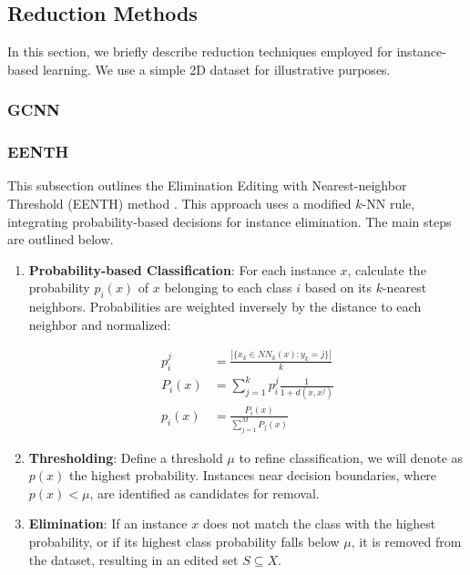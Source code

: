 
\subsection{Reduction Methods}
In this section, we briefly describe reduction techniques employed for instance-based learning. We use a simple 2D dataset for illustrative purposes.

\subsubsection{GCNN}


\subsubsection{EENTH}
This subsection outlines the Elimination Editing with Nearest-neighbor Threshold (EENTH) method \cite{vazquez2005}. This approach uses a modified $k$-NN rule, integrating probability-based decisions for instance elimination. The main steps are outlined below.

\begin{enumerate}
    \item \textbf{Probability-based Classification}: For each instance $ x $, calculate the probability $ p_i(x) $ of $ x $ belonging to each class $ i $ based on its $k$-nearest neighbors. Probabilities are weighted inversely by the distance to each neighbor and normalized:


	\begin{center}
	\begin{align}
		p_i^j &= \frac{|\{x_k \in NN_k(x) : y_k=j \}|}{k} \\
		P_i(x) &= \sum_{j=1}^{k} p_i^j \frac{1}{1 + d(x, x^j)} \\
		p_i(x) &= \frac{P_i(x)}{\sum_{j=1}^{M} P_j(x)}
	\end{align}
	\end{center}

    
    \item \textbf{Thresholding}: Define a threshold $ \mu $ to refine classification, we will denote as $p(x)$ the highest probability. Instances near decision boundaries, where $ p(x) < \mu $, are identified as candidates for removal.
    
    \item \textbf{Elimination}: If an instance $ x $ does not match the class with the highest probability, or if its highest class probability falls below $ \mu $, it is removed from the dataset, resulting in an edited set $ S \subseteq X $.
\end{enumerate}

